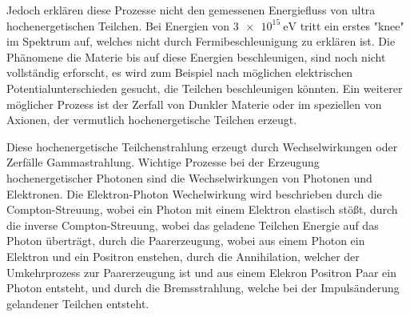Jedoch erklären diese Prozesse nicht den gemessenen Energiefluss von ultra hochenergetischen Teilchen. Bei Energien von $\SI{3e15}{\eV}$ tritt ein erstes
"knee" im Spektrum auf, welches nicht durch Fermibeschleunigung zu erklären ist.
Die Phänomene die Materie bis auf diese Energien beschleunigen, sind noch nicht vollständig erforscht, es wird zum Beispiel nach möglichen elektrischen
Potentialunterschieden gesucht, die Teilchen beschleunigen könnten.
Ein weiterer möglicher Prozess ist der Zerfall von Dunkler Materie oder im speziellen von Axionen, der vermutlich hochenergetische Teilchen erzeugt.

Diese hochenergetische Teilchenstrahlung erzeugt durch Wechselwirkungen oder Zerfälle Gammastrahlung.
Wichtige Prozesse bei der Erzeugung hochenergetischer Photonen sind die Wechselwirkungen von Photonen und Elektronen.
Die Elektron-Photon Wechelwirkung wird beschrieben durch die
Compton-Streuung, wobei ein Photon mit einem Elektron elastisch stößt, durch die inverse Compton-Streuung, wobei das geladene Teilchen Energie auf das Photon
überträgt, durch die Paarerzeugung, wobei aus einem Photon ein Elektron
und ein Positron enstehen, durch die Annihilation, welcher der Umkehrprozess zur Paarerzeugung ist und aus einem Elekron Positron Paar
ein Photon entsteht, und durch die Bremsstrahlung, welche bei der Impulsänderung gelandener Teilchen entsteht.

